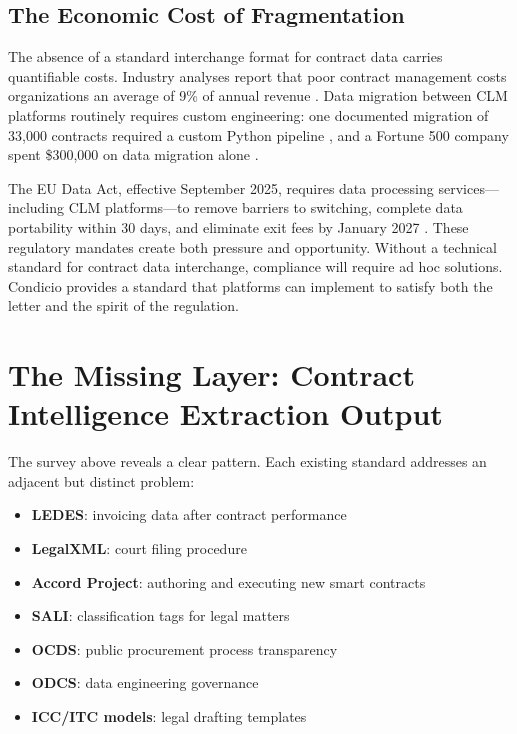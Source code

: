 \documentclass[11pt,a4paper]{article}
\begin{document}
\subsection{The Economic Cost of Fragmentation}

The absence of a standard interchange format for contract data carries quantifiable costs. Industry analyses report that poor contract management costs organizations an average of 9\% of annual revenue \cite{worldcc}. Data migration between CLM platforms routinely requires custom engineering: one documented migration of 33,000 contracts required a custom Python pipeline \cite{aavenir-migration}, and a Fortune 500 company spent \$300,000 on data migration alone \cite{ironclad-cost}.

The EU Data Act, effective September 2025, requires data processing services---including CLM platforms---to remove barriers to switching, complete data portability within 30 days, and eliminate exit fees by January 2027 \cite{eu-data-act}. These regulatory mandates create both pressure and opportunity. Without a technical standard for contract data interchange, compliance will require ad hoc solutions. Condicio provides a standard that platforms can implement to satisfy both the letter and the spirit of the regulation.

\section{The Missing Layer: Contract Intelligence Extraction Output}

The survey above reveals a clear pattern. Each existing standard addresses an adjacent but distinct problem:

\begin{itemize}[noitemsep]
  \item \textbf{LEDES}: invoicing data after contract performance
  \item \textbf{LegalXML}: court filing procedure
  \item \textbf{Accord Project}: authoring and executing new smart contracts
  \item \textbf{SALI}: classification tags for legal matters
  \item \textbf{OCDS}: public procurement process transparency
  \item \textbf{ODCS}: data engineering governance
  \item \textbf{ICC/ITC models}: legal drafting templates
\end{itemize}
\end{document}
